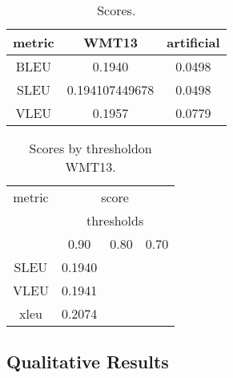 \begin{table}[h]
  \centering
  \begin{tabular}{|c|c|c|}
\hline
metric & WMT13 & artificial \\
\hline
BLEU & 0.1940 & 0.0498 \\
SLEU & 0.194107449678 & 0.0498 \\
VLEU & 0.1957 & 0.0779 \\
\hline
  \end{tabular}
  \caption{Scores.}
  \label{tab:scores}
\end{table}

\begin{table}
  \centering
  \begin{tabular}{|c|c|c|c|}
\hline
metric & \multicolumn{3}{c}{score} \\
 & \multicolumn{3}{c}{thresholds} \\
 & 0.90 & 0.80 & 0.70 \\
\hline
SLEU & 0.1940 & & \\
VLEU & 0.1941 & & \\
xleu & 0.2074 & & \\
      \end{tabular}
  \caption{Scores by thresholdon WMT13.}
  \label{tab:thresholded}
\end{table}
\subsection{Qualitative Results}
\label{sec:qual}



